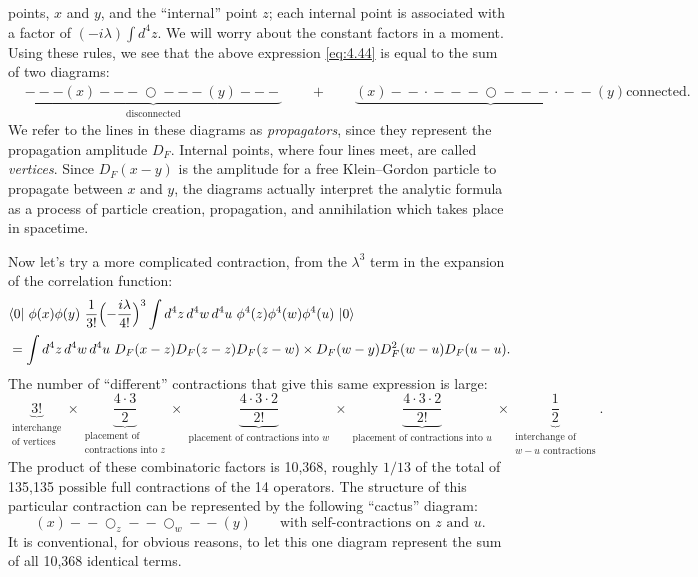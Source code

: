 points, $x$ and $y$, and the ``internal'' point $z$; each internal point is
associated with a factor of $(-i\lambda)\int d^4z$.  We will worry about the
constant factors in a moment.  Using these rules, we see that the above
expression \eqref{eq:4.44} is equal to the sum of two diagrams:
\begin{equation}
  \begin{aligned}
    &\underbrace{---\!(x)---\!\bigcirc\!---(y)---}_{\text{disconnected}}
      \qquad + \qquad
    \underbrace{(x)\!-\!-\!\cdot\!-\!-\!-\!\bigcirc\!-\!-\!-\!\cdot\!-\!-\!(y)}
      {\text{connected}} .
  \end{aligned}
\end{equation}
We refer to the lines in these diagrams as \emph{propagators}, since they
represent the propagation amplitude $D_F$.  Internal points, where four lines
meet, are called \emph{vertices}.  Since $D_F(x-y)$ is the amplitude for a
free Klein--Gordon particle to propagate between $x$ and $y$, the diagrams
actually interpret the analytic formula as a process of particle creation,
propagation, and annihilation which takes place in spacetime.

Now let's try a more complicated contraction, from the $\lambda^3$ term in
the expansion of the correlation function:
\begin{equation}
  \begin{aligned}
    &\langle 0|\ \phi(x)\phi(y)\ \frac{1}{3!}\Bigl( -\frac{i\lambda}{4!}
      \Bigr)^3 \int d^4z\,d^4w\,d^4u\ \phi^4(z)\phi^4(w)\phi^4(u)\ |0\rangle\\
    &= \int d^4z\,d^4w\,d^4u\ D_F(x-z)D_F(z-z)D_F(z-w)
      \times D_F(w-y)D_F^2(w-u)D_F(u-u) .
  \end{aligned}
  \label{eq:4.45}
\end{equation}
The number of ``different'' contractions that give this same expression is
large:
\begin{equation}
  \underbrace{3!}_{\substack{\text{interchange}\\ \text{of vertices}}}
  \times \underbrace{\frac{4\cdot 3}{2}}_{\substack{\text{placement of}\\
    \text{contractions into }z}}
  \times \underbrace{\frac{4\cdot 3\cdot 2}{2!}}_{\substack{\text{placement}
    \text{ of contractions into }w}}
  \times \underbrace{\frac{4\cdot 3\cdot 2}{2!}}_{\substack{\text{placement}
    \text{ of contractions into }u}}
  \times \underbrace{\frac{1}{2}}_{\substack{\text{interchange of}\\
    w-u \text{ contractions}}} .
\end{equation}
The product of these combinatoric factors is 10,368, roughly $1/13$ of the
total of 135,135 possible full contractions of the 14 operators.  The
structure of this particular contraction can be represented by the following
``cactus'' diagram:
\begin{equation}
  (x)\!-\!-\!\bigcirc_{z}\!-\!-\!\bigcirc_{w}\!-\!-\!(y)
  \qquad\text{with self-contractions on } z \text{ and } u .
\end{equation}
It is conventional, for obvious reasons, to let this one diagram represent
the sum of all 10,368 identical terms.


